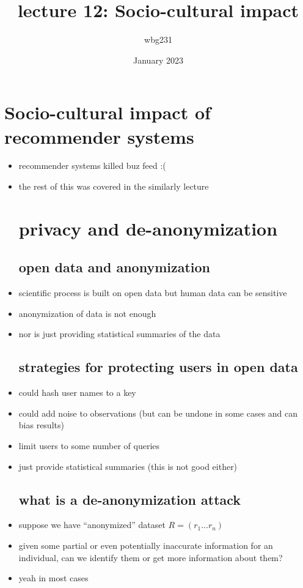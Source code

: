 \documentclass{article}
\title{lecture 12: Socio-cultural impact }
\author{wbg231 }
\date{January 2023}
\begin{document}
\maketitle

\section{Socio-cultural impact of recommender systems}
\begin{itemize}
\item recommender systems killed buz feed :(
\item the rest of this was covered in the similarly lecture
\section*{privacy and de-anonymization}
\subsection*{open data and anonymization }
\item  scientific process is built on open data but human data can be sensitive
\item anonymization of data is not enough 
\item nor is just providing statistical summaries of the data
\subsection*{strategies for protecting users in open data}
\item could hash user names to a key 
\item could add noise to observations (but can be undone in some cases and can bias results)
\item limit users to some number of queries 
\item just provide statistical summaries (this is not good either)
\subsection*{what is a de-anonymization attack}
\item suppose we have “anonymized” dataset $R=(r_1...r_n)$
\item given some partial or even potentially inaccurate information for an individual, can we identify them or get more information about them?
\item yeah in most cases 

\end{itemize}
\end{document}
